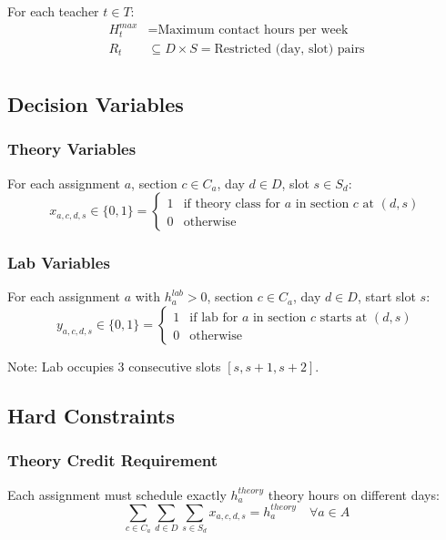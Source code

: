 \documentclass[12pt,a4paper]{article}
\begin{document}
For each teacher $t \in T$:
\begin{align*}
H_t^{max} &= \text{Maximum contact hours per week} \\
R_t &\subseteq D \times S = \text{Restricted (day, slot) pairs} \\
\end{align*}

\subsection{Decision Variables}

\subsubsection{Theory Variables}
For each assignment $a$, section $c \in C_a$, day $d \in D$, slot $s \in S_d$:
\begin{equation}
x_{a,c,d,s} \in \{0, 1\} = \begin{cases}
1 & \text{if theory class for } a \text{ in section } c \text{ at } (d,s) \\
0 & \text{otherwise}
\end{cases}
\end{equation}

\subsubsection{Lab Variables}
For each assignment $a$ with $h_a^{lab} > 0$, section $c \in C_a$, day $d \in D$, start slot $s$:
\begin{equation}
y_{a,c,d,s} \in \{0, 1\} = \begin{cases}
1 & \text{if lab for } a \text{ in section } c \text{ starts at } (d,s) \\
0 & \text{otherwise}
\end{cases}
\end{equation}

Note: Lab occupies 3 consecutive slots $[s, s+1, s+2]$.


\subsection{Hard Constraints}

\subsubsection{Theory Credit Requirement}
Each assignment must schedule exactly $h_a^{theory}$ theory hours on different days:
\begin{equation}
\sum_{c \in C_a} \sum_{d \in D} \sum_{s \in S_d} x_{a,c,d,s} = h_a^{theory} \quad \forall a \in A
\end{equation}
\end{document}
